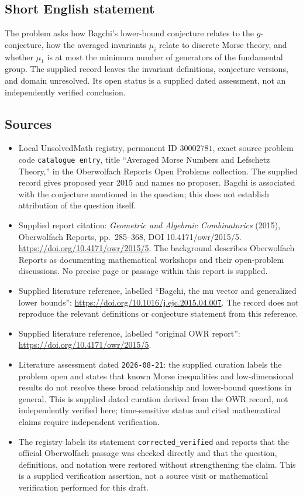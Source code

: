 \documentclass[11pt]{article}
\begin{document}
\subsection{Short English statement}
The problem asks how Bagchi's lower-bound conjecture relates to the \(g\)-conjecture, how the averaged invariants \(\mu_i\) relate to discrete Morse theory, and whether \(\mu_1\) is at most the minimum number of generators of the fundamental group. The supplied record leaves the invariant definitions, conjecture versions, and domain unresolved. Its open status is a supplied dated assessment, not an independently verified conclusion.
\subsection{Sources}
\begin{itemize}
\item Local UnsolvedMath registry, permanent ID \(30002781\), exact source problem code \texttt{catalogue entry}, title ``Averaged Morse Numbers and Lefschetz Theory,'' in the Oberwolfach Reports Open Problems collection. The supplied record gives proposed year 2015 and names no proposer. Bagchi is associated with the conjecture mentioned in the question; this does not establish attribution of the question itself.
\item Supplied report citation: \emph{Geometric and Algebraic Combinatorics} (2015), Oberwolfach Reports, pp.\ 285--368, DOI 10.4171/owr/2015/5. \url{https://doi.org/10.4171/owr/2015/5}. The background describes Oberwolfach Reports as documenting mathematical workshops and their open-problem discussions. No precise page or passage within this report is supplied.
\item Supplied literature reference, labelled ``Bagchi, the mu vector and generalized lower bounds'': \url{https://doi.org/10.1016/j.ejc.2015.04.007}. The record does not reproduce the relevant definitions or conjecture statement from this reference.
\item Supplied literature reference, labelled ``original OWR report'': \url{https://doi.org/10.4171/owr/2015/5}.
\item Literature assessment dated \texttt{2026-08-21}: the supplied curation labels the problem open and states that known Morse inequalities and low-dimensional results do not resolve these broad relationship and lower-bound questions in general. This is supplied dated curation derived from the OWR record, not independently verified here; time-sensitive status and cited mathematical claims require independent verification.
\item The registry labels its statement \texttt{corrected\_verified} and reports that the official Oberwolfach passage was checked directly and that the question, definitions, and notation were restored without strengthening the claim. This is a supplied verification assertion, not a source visit or mathematical verification performed for this draft.
\end{itemize}
\end{document}
